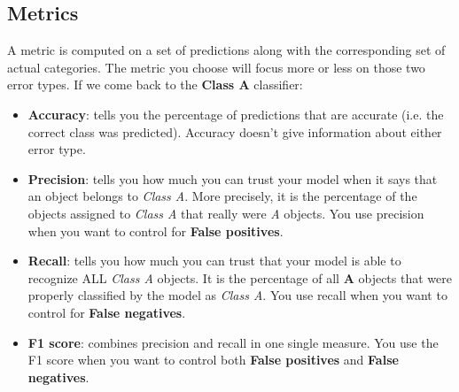 \subsection*{Metrics}
A metric is computed on a set of predictions along with the corresponding set of actual categories.
The metric you choose will focus more or less on those two error types.
If we come back to the \textbf{Class A} classifier:
\begin{itemize}
    \item \textbf{Accuracy}: tells you the percentage of predictions that are accurate (i.e. the correct class was predicted).
          Accuracy doesn't give information about either error type.
    \item \textbf{Precision}: tells you how much you can trust your model when it says that an object belongs to \textit{Class A}.
          More precisely, it is the percentage of the objects assigned to \textit{Class A} that really were \textit{A} objects.
          You use precision when you want to control for \textbf{False positives}.
    \item \textbf{Recall}: tells you how much you can trust that your model is able to recognize ALL \textit{Class A} objects.
          It is the percentage of all \textbf{A} objects that were properly classified by the model as \textit{Class A}.
          You use recall when you want to control for \textbf{False negatives}.
    \item \textbf{F1 score}: combines precision and recall in one single measure.
          You use the F1 score when you want to control both \textbf{False positives} and \textbf{False negatives}.
\end{itemize}
